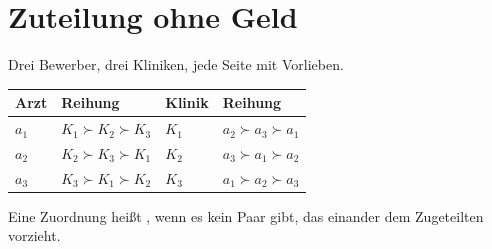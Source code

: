 \section{Zuteilung ohne Geld}

\begin{merksatz}
Drei Bewerber, drei Kliniken, jede Seite mit Vorlieben.

\begin{center}
{\small
\renewcommand{\arraystretch}{1.5}
\begin{tabular}{@{}P{2.0cm}P{2.8cm}P{2.0cm}P{2.8cm}@{}}
\toprule
\textbf{Arzt} & \textbf{Reihung} & \textbf{Klinik} & \textbf{Reihung}\\
\midrule
$a_1$ & $K_1 \succ K_2 \succ K_3$ & $K_1$ & $a_2 \succ a_3 \succ a_1$\\
$a_2$ & $K_2 \succ K_3 \succ K_1$ & $K_2$ & $a_3 \succ a_1 \succ a_2$\\
$a_3$ & $K_3 \succ K_1 \succ K_2$ & $K_3$ & $a_1 \succ a_2 \succ a_3$\\
\bottomrule
\end{tabular}}
\end{center}
\end{merksatz}

\begin{definition}
Eine Zuordnung heißt , wenn es kein Paar gibt, das einander dem Zugeteilten vorzieht.
\end{definition}

